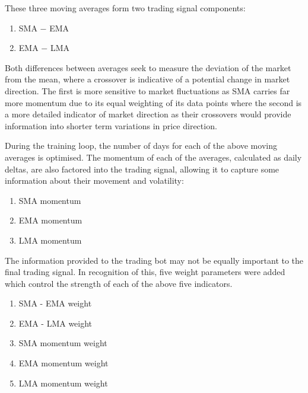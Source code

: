 \documentclass[a4paper, 12pt]{extarticle}
\begin{document}
These three moving averages form two trading signal components: 

\begin{enumerate}
    \item SMA $-$ EMA 
    \item EMA $-$ LMA 
\end{enumerate}

Both differences between averages seek to measure the deviation of the market from the mean, where a crossover is indicative of a potential change in market direction. The first is more sensitive to market fluctuations as SMA carries far more momentum due to its equal weighting of its data points where the second is a more detailed indicator of market direction as their crossovers would provide information into shorter term variations in price direction. 

During the training loop, the number of days for each of the above moving averages is optimised. The momentum of each of the averages, calculated as daily deltas, are also factored into the trading signal, allowing it to capture some information about their movement and volatility: 

\begin{enumerate}[start=3]
    \item SMA momentum 
    \item EMA momentum 
    \item LMA momentum 
\end{enumerate}

The information provided to the trading bot may not be equally important to the final trading signal. In recognition of this, five weight parameters were added which control the strength of each of the above five indicators. 

\begin{enumerate}[start=6]
    \item SMA - EMA weight 
    \item EMA - LMA weight 
    \item SMA momentum weight 
    \item EMA momentum weight 
    \item LMA momentum weight 
\end{enumerate}
\end{document}
